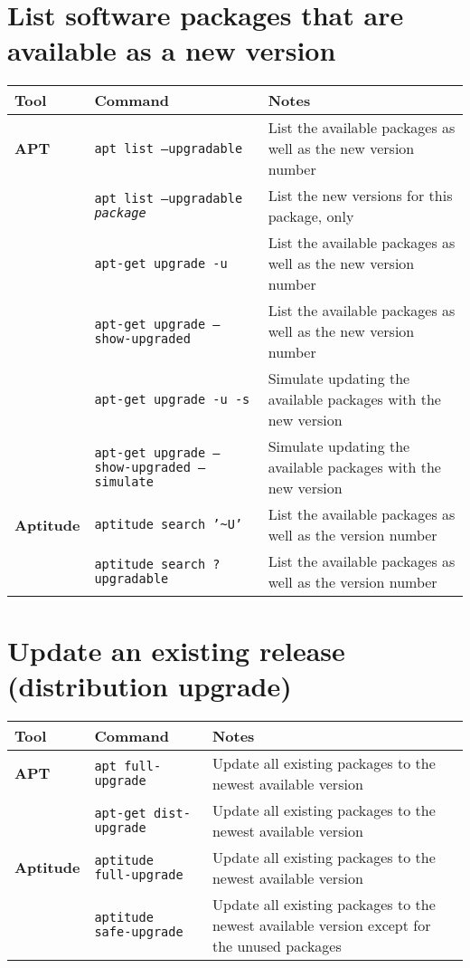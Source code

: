\documentclass[10pt]{article}
\begin{document}
\section{List software packages that are available as a new version}
\begin{tabular}{ p{3.5cm} p{9cm} p{11cm}}
  \hline
  \rowcolor{Gray}
  \textbf{Tool} & \textbf{Command} & \textbf{Notes} \\
  \hline 
  \textbf{APT} & \texttt{apt list --upgradable} & List the available packages as well as the new version number \\
  \rowcolor{Gray}
  & \texttt{apt list --upgradable \textit{package}} & List the new versions for this package, only \\
  & \texttt{apt-get upgrade -u} & List the available packages as well as the new version number \\
  \rowcolor{Gray}
  & \texttt{apt-get upgrade --show-upgraded} & List the available packages as well as the new version number \\
  & \texttt{apt-get upgrade -u -s} & Simulate updating the available packages with the new version \\
  \rowcolor{Gray}
  & \texttt{apt-get upgrade --show-upgraded --simulate} & Simulate updating the available packages with the new version \\
  \textbf{Aptitude} & \texttt{aptitude search '\textasciitilde{U}'} & List the available packages as well as the version number \\
  \rowcolor{Gray}
  & \texttt{aptitude search ?upgradable} &  List the available packages as well as the version number \\
  \hline
\end{tabular}

\section{Update an existing release (distribution upgrade)}
\begin{tabular}{ p{3.5cm} p{9cm} p{11cm}}
  \hline
  \rowcolor{Gray}
  \textbf{Tool} & \textbf{Command} & \textbf{Notes} \\
  \hline 
  \textbf{APT} & \texttt{apt full-upgrade} & Update all existing packages to the newest available version \\
  \rowcolor{Gray}
  & \texttt{apt-get dist-upgrade} & Update all existing packages to the newest available version \\
  \textbf{Aptitude} & \texttt{aptitude full-upgrade} & Update all existing packages to the newest available version \\
  \rowcolor{Gray}
  & \texttt{aptitude safe-upgrade} &  Update all existing packages to the newest available version except for the unused packages \\
  \hline
\end{tabular}
\end{document}
